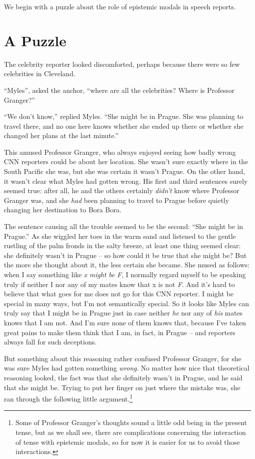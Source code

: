 \documentclass[
  10pt,
  letterpaper,
  DIV=11,
  numbers=noendperiod,
  twoside]{scrartcl}
\begin{document}
We begin with a puzzle about the role of epistemic modals in speech
reports.

\section{A Puzzle}\label{a-puzzle}

The celebrity reporter looked discomforted, perhaps because there were
so few celebrities in Cleveland.

``Myles'', asked the anchor, ``where are all the celebrities? Where is
Professor Granger?''

``We don't know,'' replied Myles. ``She might be in Prague. She was
planning to travel there, and no one here knows whether she ended up
there or whether she changed her plans at the last minute.''

This amused Professor Granger, who always enjoyed seeing how badly wrong
CNN reporters could be about her location. She wasn't sure exactly where
in the South Pacific she was, but she was certain it wasn't Prague. On
the other hand, it wasn't clear what Myles had gotten wrong. His first
and third sentences surely seemed true: after all, he and the others
certainly \emph{didn't} know where Professor Granger was, and she
\emph{had} been planning to travel to Prague before quietly changing her
destination to Bora Bora.

The sentence causing all the trouble seemed to be the second: ``She
might be in Prague.'' As she wiggled her toes in the warm sand and
listened to the gentle rustling of the palm fronds in the salty breeze,
at least one thing seemed clear: she definitely wasn't in Prague -- so
how could it be true that she might be? But the more she thought about
it, the less certain she became. She mused as follows: when I say
something like \emph{x might be F}, I normally regard myself to be
speaking truly if neither I nor any of my mates know that x is not
\emph{F}. And it's hard to believe that what goes for me does not go for
this CNN reporter. I might be special in many ways, but I'm not
semantically special. So it looks like Myles can truly say that I might
be in Prague just in case neither \emph{he} nor any of \emph{his} mates
knows that I am not. And I'm sure none of them knows that, because I've
taken great pains to make them think that I am, in fact, in Prague --
and reporters always fall for such deceptions.

But something about this reasoning rather confused Professor Granger,
for she was sure Myles had gotten something \emph{wrong}. No matter how
nice that theoretical reasoning looked, the fact was that she definitely
wasn't in Prague, and he said that she might be. Trying to put her
finger on just where the mistake was, she ran through the following
little argument.\footnote{Some of Professor Granger's thoughts sound a
  little odd being in the present tense, but as we shall see, there are
  complications concerning the interaction of tense with epistemic
  modals, so for now it is easier for us to avoid those interactions.}
\end{document}

